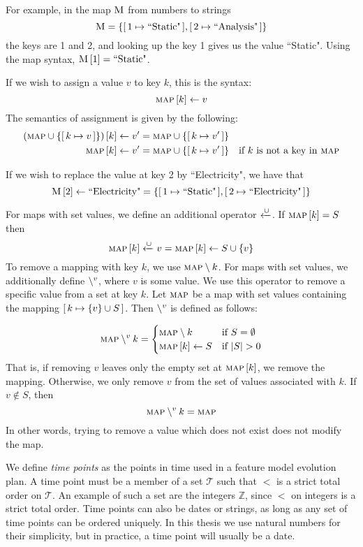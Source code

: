 For example, in the map $\textsc{M}$ from numbers to strings 
\[
  \textsc{M} = \{[ \,1 \mapsto \text{``Static"}\, ],\allowbreak [ \,2 \mapsto \text{``Analysis"}\, ]\}
\]
the keys are 1 and 2, and looking up the key 1 gives us the value ``Static". Using the map syntax, $\textsc{M} \left[ 1 \right] = \text{``Static"}$. 

If we wish to assign a value $v$ to key $k$, this is the syntax:
\[
\textsc{map} \left[ k \right] \leftarrow v
\]
The semantics of assignment is given by the following:
\begin{align*}
  \left(\textsc{map} \cup \left\{[ \,k \mapsto v\, ]\right\}\right) \left[ k \right] \leftarrow v' &= \textsc{map} \cup \left\{[ \,k \mapsto v'\, ]\right\} &&\\
  \textsc{map} \left[ k \right] \leftarrow v' &= \textsc{map} \cup \left\{[ \,k \mapsto v'\, ]\right\} && \text{if $k$ is not a key in \textsc{map}}
\end{align*}

If we wish to replace the value at key 2 by ``Electricity", we have that
\[
  \textsc{M} \left[ 2 \right] \leftarrow \text{``Electricity"} = \{[ \,1 \mapsto \text{``Static"}\, ],\allowbreak [ \,2 \mapsto \text{``Electricity"}\, ]\}
\]

For maps with set values, we define an additional operator $\xleftarrow{\cup}$. If $\textsc{map} \left[ k \right] = S$ then 
\[\textsc{map} \left[ k \right] \xleftarrow{\cup} v = \textsc{map} \left[ k \right] \leftarrow S \cup \{v\}\]
To remove a mapping with key $k$, we use $\textsc{map} \setminus k$. For maps with set values, we additionally define $\setminus^{v}$, where $v$ is some value. We use this operator to remove a specific value from a set at key $k$. Let $\textsc{map}$ be a map with set values containing the mapping $[ \,k \mapsto \{v\} \cup S\, ]$. Then $\setminus^{v}$ is defined as follows:

\[
  \textsc{map} \setminus^{v} k =
  \begin{cases}
    \textsc{map} \setminus k & \text{if } S = \emptyset\\
    \textsc{map} \left[ k \right] \leftarrow S & \text{if } |S| > 0
  \end{cases}
\]
That is, if removing $v$ leaves only the empty set at $\textsc{map} \left[ k \right]$, we remove the mapping. Otherwise, we only remove $v$ from the set of values associated with $k$. If $v \notin S$, then
\[
  \textsc{map} \setminus^{v} k = \textsc{map}
\]
In other words, trying to remove a value which does not exist does not modify the map.

We define \emph{time points} as the points in time used in a feature model evolution plan. A time point must be a member of a set $\mathcal{T}$ such that $<$ is a strict total order on $\mathcal{T}$. An example of such a set are the integers $\mathbb{Z}$, since $<$ on integers is a strict total order. Time points can also be dates or strings, as long as any set of time points can be ordered uniquely. In this thesis we use natural numbers for their simplicity, but in practice, a time point will usually be a date.

